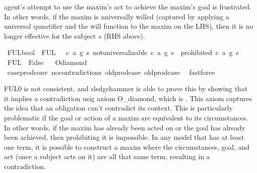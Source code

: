 \begin{isabellebody}
\begin{isamarkuptext}
agent's attempt to use the maxim's act to achieve the maxim's goal is frustrated. In other words, if 
the maxim is universally willed (captured by applying a universal qunatifier and the will function 
to the maxim on the LHS), then it is no longer effective for the subject $s$ (RHS above).%
\end{isamarkuptext}\isamarkuptrue%
\isamarkupfalse%
\ FUL{}{\isacharcolon}{\isacharcolon}bool\ \ {\isachardoublequoteopen}FUL{}\ {\isasymequiv}\ {\isasymforall}\ c\ a\ g\ s{\isachardot}\ not{\isacharunderscore}universalizable\ {\isacharparenleft}c{\isacharcomma}\ a{\isacharcomma}\ g{\isacharparenright}\ s\ {\isasymlongrightarrow}\ {\isasymTurnstile}{\isacharparenleft}{\isacharparenleft}prohibited\ {\isacharparenleft}c{\isacharcomma}\ a{\isacharcomma}\ g{\isacharparenright}\ s{\isacharparenright}{\isacharparenright}{\isachardoublequoteclose}\isanewline
%
\isanewline
\isanewline
{}\isamarkupfalse%
\ {\isachardoublequoteopen}FUL{}\ {\isasymlongrightarrow}\ False{\isachardoublequoteclose}%
\isadelimproof
\ %
\endisadelimproof
%
\isatagproof
{}\isamarkupfalse%
\ O{\isacharunderscore}diamond\isanewline
\ \ \isamarkupfalse%
\ case{\isacharunderscore}prod{\isacharunderscore}conv\ no{\isacharunderscore}contradictions\ old{\isachardot}prod{\isachardot}case\ old{\isachardot}prod{\isachardot}case\ \isamarkupfalse%
\ fastforce%
\endisatagproof
{\isafoldproof}%
%
\isadelimproof
%
\endisadelimproof
%
\begin{isamarkuptext}%
FUL0 is not consistent, and sledgehammer is able to prove this by showing that it implies a contradiction 
usig axiom O\_diamond, which is . This axiom captures 
the idea that an obligation can't contradict its context. This is particularly problematic if the goal or 
action of a maxim are equivalent to its circumstances. In other words, if the maxim has already been 
acted on or the goal has already been achieved, then prohibiting it is impossible. 
In any model that has at least one term, it is possible to construct a maxim where the circumstances, goal, 
and act (once a subject acts on it) are all that same term, resulting in a contradiction. 


\end{isamarkuptext}
\end{isabellebody}
